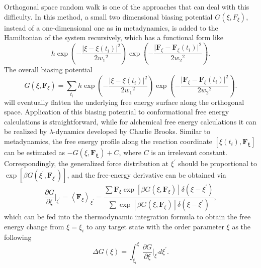 Orthogonal space random walk is one of the approaches that can deal with this difficulty. In this method, a small two dimensional biasing potential $G(\xi,F_{\xi})$, instead of a one-dimensional one as in metadynamics, is added to the Hamiltonian of the system recursively, which has a functional form like
\begin{equation}
   h\exp{\left(-\frac{\lvert\xi-\xi(t_i)\rvert^2}{2{w_1}^2}\right)}\exp{\left(-\frac{\lvert \mathbf{F}_{\xi}-\mathbf{F}_{\xi}(t_i)\rvert^2}{2{w_2}^2}\right)}.
\end{equation}
The overall biasing potential
\begin{equation}
G(\xi,\mathbf{F}_\xi)=\sum\limits_{t_i}h\exp{\left(-\frac{\lvert\xi-\xi(t_i)\rvert^2}{2{w_1}^2}\right)}\exp{\left(-\frac{\lvert \mathbf{F}_{\xi}-\mathbf{F}_{\xi}(t_i)\rvert^2}{2{w_2}^2}\right)}.
\end{equation}
will eventually flatten the underlying free energy surface along the orthogonal space.
Application of this biasing potential to conformational free energy calculations is straightforward, while for alchemical free energy calculations it can be realized by $\lambda$-dynamics developed by Charlie Brooks.\cite{KongJCP1996} Similar to metadynamics, the free energy profile along the reaction coordinate $\left[\xi(t_i), \mathbf{F_\xi}\right]$ can be estimated as $-G\left(\xi,\mathbf{F_{\xi}}\right)+C$, where $C$ is an irrelevant constant. Correspondingly, the generalized force distribution at $\xi^\prime$ should be proportional to $\exp{\left[\beta G\left(\xi^\prime,\mathbf{F}_{\xi^\prime}\right)\right]}$, and the free-energy derivative can be obtained via
\begin{equation}
	\frac{\partial G}{\partial \xi}\bigg\rvert_{\xi^\prime}=\left<\mathbf{F}_\xi\right>_{\xi^\prime}=\frac{\sum\mathbf{F}_\xi\exp{\left[\beta G(\xi,\mathbf{F}_\xi)\right]}\delta(\xi-\xi^\prime)}{\sum\exp{\left[\beta G(\xi,\mathbf{F}_\xi)\right]}\delta(\xi-\xi^\prime)},
\end{equation}
which can be fed into the thermodynamic integration formula to obtain the free energy change from $\xi=\xi_i$ to any target state with the order parameter $\xi$ as the following
\begin{equation}
	\Delta G(\xi) = \int_{\xi_i}^{\xi}\frac{\partial G}{\partial \xi}\bigg\rvert_{\xi^\prime}d\xi^\prime.
\end{equation}